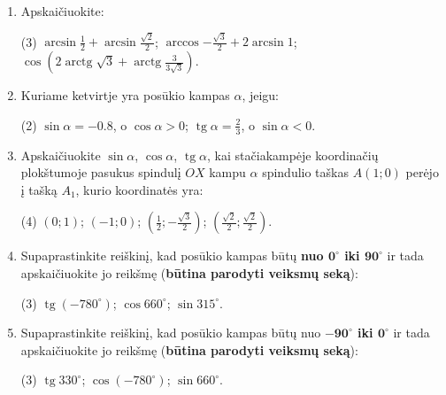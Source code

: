 \documentclass[a4paper]{article}
\DeclareMathOperator{\tg}{tg}
\DeclareMathOperator{\arctg}{arctg}
\begin{document}
\begin{enumerate}
      \item Apskaičiuokite:

            \begin{tasks}[item-format={\normalfont}, after-item-skip=4mm](3)
                  \task $\arcsin{\frac{1}{2}} + \arcsin{\frac{\sqrt{2}}{2}} $;
                  \task $\arccos{-\frac{\sqrt{3}}{2}} + 2\arcsin{1} $;
                  \task $\cos({2\arctg{\sqrt{3}} +
                              \arctg{\frac{3}{3\sqrt{3}}}})  $.

            \end{tasks}

      \item Kuriame ketvirtje yra posūkio kampas $\alpha$, jeigu:
            \begin{tasks}[item-format={\normalfont}, after-item-skip=4mm](2)
                  \task $\sin \alpha = -0.8$, o $\cos \alpha > 0$;
                  \task $\tg \alpha = \frac{2}{3}$, o $\sin \alpha < 0$.
            \end{tasks}
      \item Apskaičiuokite $\sin \alpha$, $\cos \alpha$, $\tg \alpha$, kai
            stačiakampėje koordinačių plokštumoje pasukus spindulį $OX$ kampu
            $\alpha$ spindulio taškas $A(1; 0)$ perėjo į tašką $A_{1}$, kurio
            koordinatės
            yra:
            \begin{tasks}[item-format={\normalfont}, after-item-skip=4mm](4)
                  \task $(0; 1)$;
                  \task $(-1; 0)$;
                  \task $(\frac{1}{2}; -\frac{\sqrt{3}}{2})$;
                  \task $(\frac{\sqrt{2}}{2}; \frac{\sqrt{2}}{2})$.
            \end{tasks}

      \item Supaprastinkite reiškinį, kad posūkio kampas būtų \textbf{nuo
                  $\boldsymbol{0^\circ}$
                  iki $\boldsymbol{90^\circ}$} ir tada apskaičiuokite jo
            reikšmę
            (\textbf{būtina parodyti veiksmų seką}):
            \begin{tasks}[item-format={\normalfont},
                        after-item-skip=4mm](3)
                  \task $\tg (-780^\circ)$;
                  \task $\cos 660^\circ$;
                  \task $\sin 315^\circ$.
            \end{tasks}

      \item Supaprastinkite reiškinį, kad posūkio kampas būtų nuo
            \textbf{$\boldsymbol{-90^\circ}$
                  iki  $\boldsymbol{0^\circ}$} ir tada apskaičiuokite jo
            reikšmę
            (\textbf{būtina parodyti veiksmų seką}):
            \begin{tasks}[item-format={\normalfont},
                        after-item-skip=4mm](3)
                  \task $\tg 330^\circ$;
                  \task $\cos (-780^\circ)$;
                  \task $\sin 660^\circ$.
            \end{tasks}


\end{enumerate}
\end{document}
